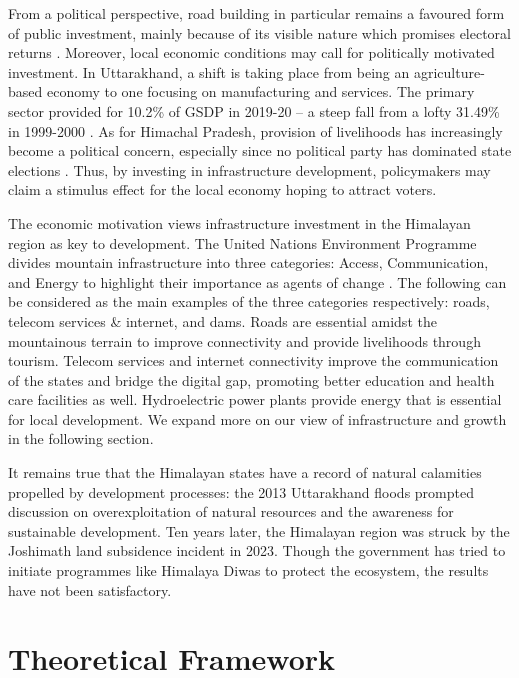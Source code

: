 \documentclass[a4paper,12pt]{article}
\begin{document}
From a political perspective, road building in particular remains a favoured form of public investment, mainly because of its visible nature which promises electoral returns \parencite{berg2015}. Moreover, local economic conditions may call for politically motivated investment. In Uttarakhand, a shift is taking place from being an agriculture-based economy to one focusing on manufacturing and services. The primary sector provided for 10.2\% of GSDP in 2019-20 – a steep fall from a lofty 31.49\% in 1999-2000 \parencite{directorate2021}. As for Himachal Pradesh, provision of livelihoods has increasingly become a political concern, especially since no political party has dominated state elections \parencite{kumar2022}. Thus, by investing in infrastructure development, policymakers may claim a stimulus effect for the local economy hoping to attract voters.

The economic motivation views infrastructure investment in the Himalayan region as key to development. The United Nations Environment Programme divides mountain infrastructure into three categories: Access, Communication, and Energy to highlight their importance as agents of change \parencite{kohler2002}. The following can be considered as the main examples of the three categories respectively: roads, telecom services \& internet, and dams. Roads are essential amidst the mountainous terrain to improve connectivity and provide livelihoods through tourism. Telecom services and internet connectivity improve the communication of the states and bridge the digital gap, promoting better education and health care facilities as well. Hydroelectric power plants provide energy that is essential for local development. We expand more on our view of infrastructure and growth in the following section.

It remains true that the Himalayan states have a record of natural calamities propelled by development processes: the 2013 Uttarakhand floods prompted discussion on overexploitation of natural resources and the awareness for sustainable development. Ten years later, the Himalayan region was struck by the Joshimath land subsidence incident in 2023. Though the government has tried to initiate programmes like Himalaya Diwas \parencite{press2021} to protect the ecosystem, the results have not been satisfactory.


\section{Theoretical Framework}
\end{document}
